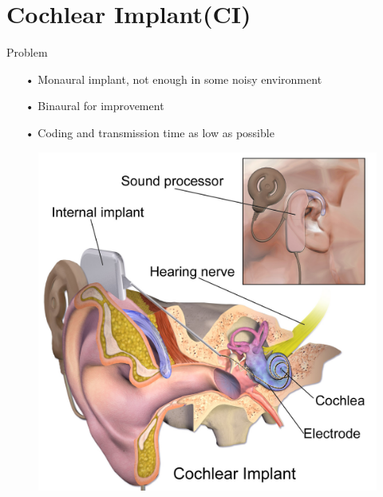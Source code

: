 \documentclass[notes=hide]{beamer}
\begin{document}
\section{Cochlear Implant(CI)}
\begin{frame}


   \begin{block}{Problem}
   	\begin{itemize}
   		\item [•] Monaural implant, not enough in some noisy environment
   		\item [•] Binaural for improvement
		\item [•] Coding and transmission time as low as possible
		
   	\end{itemize}
   \end{block}
   \begin{figure}
   	\includegraphics[scale=0.091]{Vortrag/Cochlear_implant.png}
   \end{figure}
\end{frame}


\newpage
\end{document}
